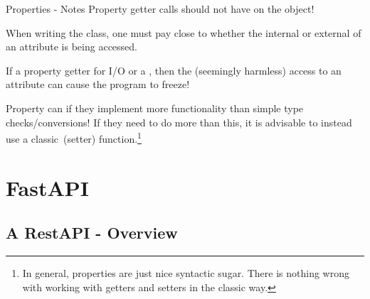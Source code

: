 \documentclass[12pt, aspectratio=169, usepdftitle=false]{beamer}
\begin{document}
\begin{frame}{Properties - Notes}
	     Property getter calls should not have  on the object!
		
		\medskip
		
		When writing the class, one must pay close  to whether the internal or external  of an attribute is being accessed.
		
		\medskip
		
		If a property getter  for I/O or a , then the (seemingly harmless) access to an attribute can cause the program to \glqq freeze\grqq!
		
		\medskip
		
		Property  can  if they implement more functionality than simple type checks/conversions!\newline
		If they need to do more than this, it is advisable to instead use a \glqq classic\grqq~(setter) function.\footnote{In general, properties are just nice syntactic sugar. There is nothing wrong with working with getters and setters in the classic way.}
\end{frame}







\section{FastAPI}


\subsection{A RestAPI - Overview}
\end{document}
